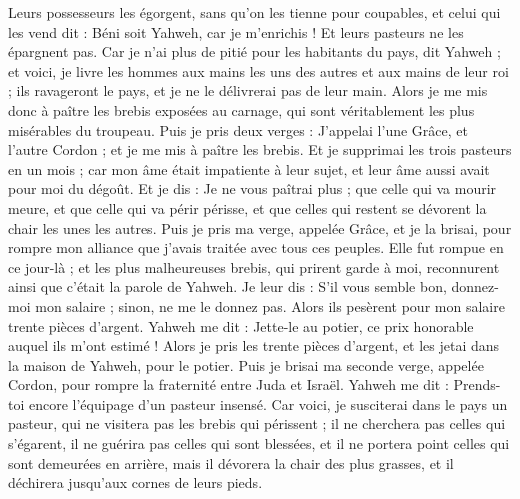 \begin{multicols}{2}
Leurs possesseurs les égorgent, sans qu'on les tienne pour coupables, et celui qui les vend dit : Béni soit Yahweh, car je m'enrichis ! Et leurs pasteurs ne les épargnent pas.
Car je n'ai plus de pitié pour les habitants du pays, dit Yahweh ; et voici, je livre les hommes aux mains les uns des autres et aux mains de leur roi ; ils ravageront le pays, et je ne le délivrerai pas de leur main.
Alors je me mis donc à paître les brebis exposées au carnage, qui sont véritablement les plus misérables du troupeau. Puis je pris deux verges : J'appelai l'une Grâce, et l'autre Cordon ; et je me mis à paître les brebis.
Et je supprimai les trois pasteurs en un mois ; car mon âme était impatiente à leur sujet, et leur âme aussi avait pour moi du dégoût.
Et je dis : Je ne vous paîtrai plus ; que celle qui va mourir meure, et que celle qui va périr périsse, et que celles qui restent se dévorent la chair les unes les autres.
Puis je pris ma verge, appelée Grâce, et je la brisai, pour rompre mon alliance que j'avais traitée avec tous ces peuples.
Elle fut rompue en ce jour-là ; et les plus malheureuses brebis, qui prirent garde à moi, reconnurent ainsi que c'était la parole de Yahweh.
Je leur dis : S'il vous semble bon, donnez-moi mon salaire ; sinon, ne me le donnez pas. Alors ils pesèrent pour mon salaire trente pièces d'argent.
Yahweh me dit : Jette-le au potier, ce prix honorable auquel ils m'ont estimé ! Alors je pris les trente pièces d'argent, et les jetai dans la maison de Yahweh, pour le potier.
Puis je brisai ma seconde verge, appelée Cordon, pour rompre la fraternité entre Juda et Israël.
Yahweh me dit : Prends-toi encore l'équipage d'un pasteur insensé.
Car voici, je susciterai dans le pays un pasteur, qui ne visitera pas les brebis qui périssent ; il ne cherchera pas celles qui s'égarent, il ne guérira pas celles qui sont blessées, et il ne portera point celles qui sont demeurées en arrière, mais il dévorera la chair des plus grasses, et il déchirera jusqu'aux cornes de leurs pieds.

\end{multicols}
